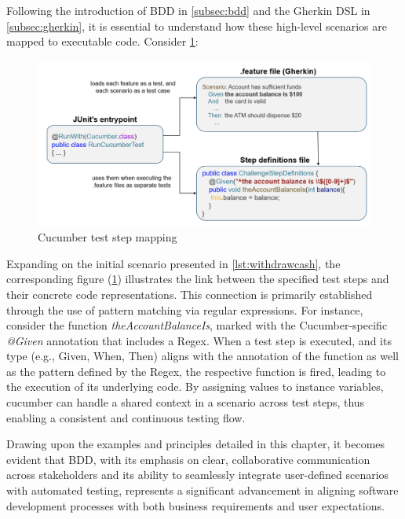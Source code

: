 Following the introduction of \ac{BDD} in \ref{subsec:bdd} and the Gherkin \ac{DSL} in \ref{subsec:gherkin}, it is essential to understand how these high-level scenarios are mapped to executable code. Consider \cref{fig:cucumber-mapping}:

\begin{figure}
    \centering
    \includegraphics[width=\linewidth]{files/figures/cucumber_test_step_mapping.png}
    \caption{Cucumber test step mapping}
    \label{fig:cucumber-mapping}
\end{figure}

Expanding on the initial scenario presented in \cref{lst:withdrawcash}, the corresponding figure (\cref{fig:cucumber-mapping}) illustrates the link between the specified test steps and their concrete code representations. This connection is primarily established through the use of pattern matching via regular expressions. For instance, consider the function \textit{theAccountBalanceIs}, marked with the Cucumber-specific \textit{@Given} annotation that includes a \ac{Regex}. When a test step is executed, and its type (e.g., Given, When, Then) aligns with the annotation of the function as well as the pattern defined by the \ac{Regex}, the respective function is fired, leading to the execution of its underlying code. By assigning values to instance variables, cucumber can handle a shared context in a scenario across test steps, thus enabling a consistent and continuous testing flow.

Drawing upon the examples and principles detailed in this chapter, it becomes evident that \ac{BDD}, with its emphasis on clear, collaborative communication across stakeholders and its ability to seamlessly integrate user-defined scenarios with automated testing, represents a significant advancement in aligning software development processes with both business requirements and user expectations.

